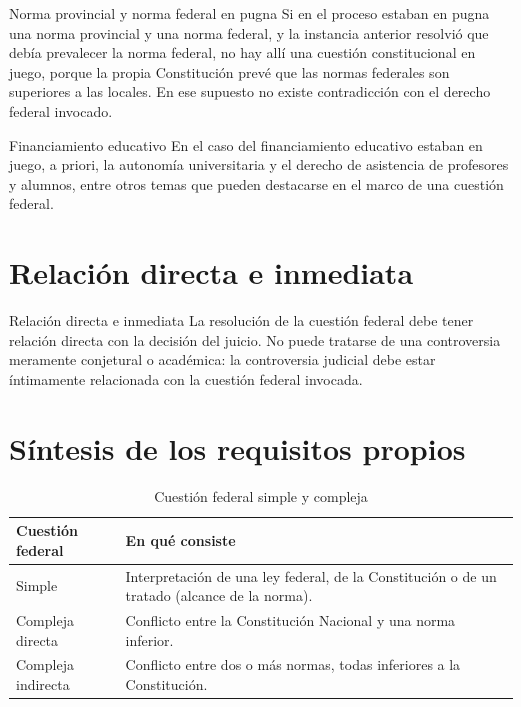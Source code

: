 \documentclass[12pt,oneside]{book}
\begin{document}
\begin{example}{Norma provincial y norma federal en pugna}
Si en el proceso estaban en pugna una norma provincial y una norma federal, y la instancia anterior resolvió que debía prevalecer la norma federal, no hay allí una cuestión constitucional en juego, porque la propia Constitución prevé que las normas federales son superiores a las locales. En ese supuesto no existe contradicción con el derecho federal invocado.
\end{example}

\begin{example}{Financiamiento educativo}
En el caso del financiamiento educativo estaban en juego, a priori, la autonomía universitaria y el derecho de asistencia de profesores y alumnos, entre otros temas que pueden destacarse en el marco de una cuestión federal.
\end{example}

\section{Relación directa e inmediata}

\begin{definition}{Relación directa e inmediata}
La resolución de la cuestión federal debe tener relación directa con la decisión del juicio. No puede tratarse de una controversia meramente conjetural o académica: la controversia judicial debe estar íntimamente relacionada con la cuestión federal invocada.
\end{definition}

\section{Síntesis de los requisitos propios}

\begin{table}[H]
\centering
\begin{tabularx}{\textwidth}{@{}>{\raggedright\arraybackslash}p{}>{\raggedright\arraybackslash}X@{}}
\toprule
\textbf{Cuestión federal} & \textbf{En qué consiste} \\
\midrule
Simple & Interpretación de una ley federal, de la Constitución o de un tratado (alcance de la norma). \\
\addlinespace[0.3em]
Compleja directa & Conflicto entre la Constitución Nacional y una norma inferior. \\
\addlinespace[0.3em]
Compleja indirecta & Conflicto entre dos o más normas, todas inferiores a la Constitución. \\
\bottomrule
\end{tabularx}
\caption{Cuestión federal simple y compleja}
\end{table}
\end{document}
